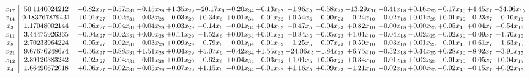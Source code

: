 \documentclass[9pt]{article}
\begin{document}
 \[\begin{array}{c| c c@{\hskip 2pt} c@{\hskip 2pt} c@{\hskip 2pt} c@{\hskip 2pt} c@{\hskip 2pt} c@{\hskip 2pt} c@{\hskip 2pt} c@{\hskip 2pt} c@{\hskip 2pt} c@{\hskip 2pt} c@{\hskip 2pt} c@{\hskip 2pt} c@{\hskip 2pt} c@{\hskip 2pt} c@{\hskip 2pt} }
 x_{17}   &  50.1140024212 & -0.82 x_{27} & -0.57 x_{31} & -0.15 x_{28} & +  1.35 x_{29} & -20.17 x_{6} & -0.20 x_{34} & -0.13 x_{32} & -1.96 x_{5} & -0.58 x_{23} & + 13.29 x_{10} & -0.41 x_{18} & +  0.16 x_{25} & -0.17 x_{30} & +  4.45 x_{7} & -34.06 x_{15}\\
 x_{14}   &  0.183767879431 & +  0.01 x_{27} & -0.02 x_{31} & -0.03 x_{28} & -0.03 x_{29} & +  0.34 x_{6} & +  0.01 x_{34} & -0.01 x_{32} & +  0.54 x_{5} & -0.00 x_{23} & -0.24 x_{10} & -0.02 x_{18} & +  0.01 x_{25} & +  0.01 x_{30} & -0.23 x_{7} & -0.10 x_{15}\\
 x_{3}   &  1.17048002144 & -0.06 x_{27} & +  0.04 x_{31} & +  0.04 x_{28} & +  0.03 x_{29} & -0.14 x_{6} & -0.01 x_{34} & +  0.04 x_{32} & -0.47 x_{5} & -0.04 x_{23} & +  0.82 x_{10} & +  0.00 x_{18} & +  0.00 x_{25} & +  0.05 x_{30} & +  0.04 x_{7} & -0.54 x_{15}\\
 x_{11}   &  3.44475926365 & -0.04 x_{27} & -0.02 x_{31} & +  0.00 x_{28} & +  0.11 x_{29} & -1.52 x_{6} & +  0.01 x_{34} & +  0.01 x_{32} & -0.84 x_{5} & -0.05 x_{23} & +  1.01 x_{10} & -0.04 x_{18} & -0.02 x_{25} & -0.02 x_{30} & -0.09 x_{7} & -1.70 x_{15}\\
 x_{8}   &  2.70233964224 & -0.05 x_{27} & +  0.02 x_{31} & -0.03 x_{28} & +  0.09 x_{29} & -0.79 x_{6} & -0.01 x_{34} & -0.01 x_{32} & -1.25 x_{5} & -0.07 x_{23} & +  0.50 x_{10} & -0.03 x_{18} & +  0.01 x_{25} & -0.01 x_{30} & +  0.61 x_{7} & -1.63 x_{15}\\
 x_{21}   &  9.67676248674 & -0.56 x_{27} & +  0.88 x_{31} & +  1.51 x_{28} & +  0.04 x_{29} & +  5.07 x_{6} & -0.42 x_{34} & +  1.55 x_{32} & -24.06 x_{5} & -1.84 x_{23} & +  6.75 x_{10} & +  0.32 x_{18} & +  0.44 x_{25} & +  0.28 x_{30} & -8.92 x_{7} & -3.91 x_{15}\\
 x_{12}   &  2.39120383242 & -0.02 x_{27} & -0.04 x_{31} & -0.01 x_{28} & +  0.01 x_{29} & -0.62 x_{6} & +  0.04 x_{34} & -0.03 x_{32} & +  1.01 x_{5} & +  0.05 x_{23} & +  0.34 x_{10} & +  0.01 x_{18} & +  0.02 x_{25} & -0.01 x_{30} & -0.05 x_{7} & +  0.04 x_{15}\\
 x_{4}   &  1.66490672018 & +  0.06 x_{27} & -0.02 x_{31} & -0.05 x_{28} & -0.07 x_{29} & +  1.15 x_{6} & -0.01 x_{34} & -0.01 x_{32} & +  1.16 x_{5} & +  0.09 x_{23} & -1.21 x_{10} & -0.02 x_{18} & +  0.00 x_{25} & -0.02 x_{30} & -0.15 x_{7} & +  0.92 x_{15}\\

\end{array}\]
\end{document}
